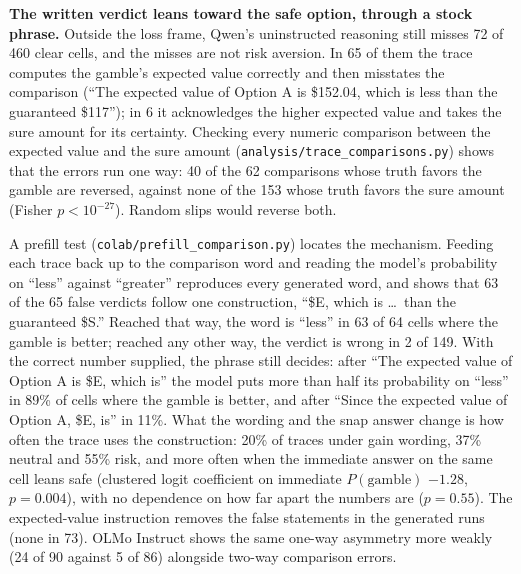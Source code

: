 \documentclass[11pt]{article}
\begin{document}
\textbf{The written verdict leans toward the safe option, through a stock phrase.} Outside the loss
frame, Qwen's uninstructed reasoning still misses 72 of 460 clear cells, and the misses are not risk
aversion. In 65 of them the trace computes the gamble's expected value correctly and then misstates the
comparison (``The expected value of Option A is \$152.04, which is less than the guaranteed \$117''); in 6
it acknowledges the higher expected value and takes the sure amount for its certainty. Checking every
numeric comparison between the expected value and the sure amount (\texttt{analysis/trace\_comparisons.py})
shows that the errors run one way: 40 of the 62 comparisons whose truth favors the gamble are reversed,
against none of the 153 whose truth favors the sure amount (Fisher $p < 10^{-27}$). Random slips would
reverse both.

A prefill test (\texttt{colab/prefill\_comparison.py}) locates the mechanism. Feeding each trace back up
to the comparison word and reading the model's probability on ``less'' against ``greater'' reproduces
every generated word, and shows that 63 of the 65 false verdicts follow one construction, ``\$E, which
is \ldots\ than the guaranteed \$S.'' Reached that way, the word is ``less'' in 63 of 64 cells where the
gamble is better; reached any other way, the verdict is wrong in 2 of 149. With the correct number
supplied, the phrase still decides: after ``The expected value of Option A is \$E, which is'' the model
puts more than half its probability on ``less'' in 89\% of cells where the gamble is better, and after
``Since the expected value of Option A, \$E, is'' in 11\%. What the wording and the snap answer change is
how often the trace uses the construction: 20\% of traces under gain wording, 37\% neutral and 55\% risk,
and more often when the immediate answer on the same cell leans safe (clustered logit coefficient on
immediate $P(\text{gamble})$ $-1.28$, $p = 0.004$), with no dependence on how far apart the numbers are
($p = 0.55$). The expected-value instruction removes the false statements in the generated runs (none in
73). OLMo Instruct shows the same one-way asymmetry more weakly (24 of 90 against 5 of 86) alongside
two-way comparison errors.
\end{document}
